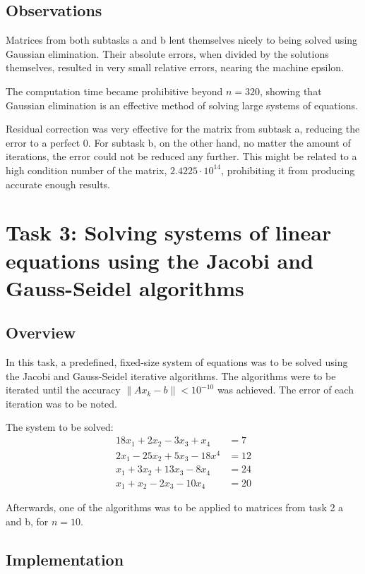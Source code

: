 \documentclass{article}
\begin{document}
	\newpage
	\subsection{Observations}

	Matrices from both subtasks a and b lent themselves nicely to being solved
	using Gaussian elimination. Their absolute errors, when divided by the
	solutions themselves, resulted in very small relative errors, nearing the
	machine epsilon.

	The computation time became prohibitive beyond $n = 320$, showing that
	Gaussian elimination is an effective method of solving large systems
	of equations.

	Residual correction was very effective for the matrix from subtask a,
	reducing the error to a perfect $0$. For subtask b, on the other hand, no
	matter the amount of iterations, the error could not be reduced any further.
	This might be related to a high condition number of the matrix,
	$2.4225 \cdot 10^{14}$, prohibiting it from producing accurate enough
	results.

	\newpage
	\section{Task 3: Solving systems of linear equations using the Jacobi and
	Gauss-Seidel algorithms}

	\subsection{Overview}

	In this task, a predefined, fixed-size system of equations was to be solved
	using the Jacobi and Gauss-Seidel iterative algorithms. The algorithms were
	to be iterated until the accuracy $\lVert Ax_k - b \rVert < 10^{-10}$ was
	achieved. The error of each iteration was to be noted.

	The system to be solved:
	\begin{align*}
		18x_1 + 2x_2 - 3x_3 + x_4 & = 7\\
		2x_1 - 25x_2 + 5x_3 - 18x^4 & = 12\\
		x_1 + 3x_2 + 13x_3 - 8x_4 & = 24\\
		x_1 + x_2 - 2x_3 - 10x_4 & = 20
	\end{align*}

	Afterwards, one of the algorithms was to be applied to matrices from task 2
	a and b, for $n = 10$.

	\subsection{Implementation}
\end{document}
